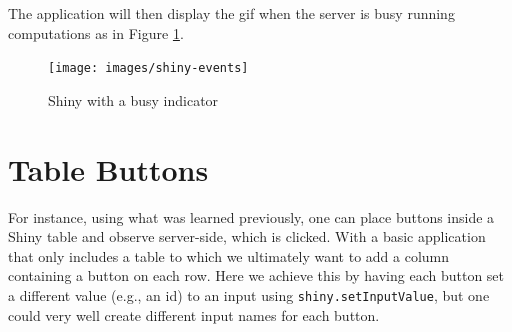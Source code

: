\documentclass[10pt,]{krantz}
\makeatletter
\newenvironment{Shaded}{\begin{snugshade}}{\end{snugshade}}
\newcommand{\ControlFlowTok}[1]{\textcolor[rgb]{0.27,0.27,0.27}{\textbf{#1}}}
\newcommand{\DataTypeTok}[1]{\textcolor[rgb]{0.27,0.27,0.27}{#1}}
\newcommand{\KeywordTok}[1]{\textcolor[rgb]{0.27,0.27,0.27}{\textbf{#1}}}
\newcommand{\NormalTok}[1]{#1}
\newcommand{\OperatorTok}[1]{\textcolor[rgb]{0.43,0.43,0.43}{\textbf{#1}}}
\newcommand{\OtherTok}[1]{\textcolor[rgb]{0.37,0.37,0.37}{#1}}
\newcommand{\StringTok}[1]{\textcolor[rgb]{0.5,0.5,0.5}{#1}}
\newenvironment{kframe}{%
\medskip{}
\setlength{\fboxsep}{.8em}
 \def\at@end@of@kframe{}%
 \ifinner\ifhmode%
  \def\at@end@of@kframe{\end{minipage}}%
  \begin{minipage}{\columnwidth}%
 \fi\fi%
 \def\FrameCommand##1{\hskip\@totalleftmargin \hskip-\fboxsep
 \colorbox{shadecolor}{##1}\hskip-\fboxsep
     \hskip-\linewidth \hskip-\@totalleftmargin \hskip\columnwidth}%
 \MakeFramed {\advance\hsize-\width
   \@totalleftmargin\z@ \linewidth\hsize
   \@setminipage}}%
 {\par\unskip\endMakeFramed%
 \at@end@of@kframe}
\renewenvironment{Shaded}{\begin{kframe}}{\end{kframe}}
\makeatother
\begin{document}
The application will then display the gif when the server is busy running computations as in Figure \ref{fig:shiny-events}.

\begin{figure}[H]

{\centering \texttt{[image: images/shiny-events]} 

}

\caption{Shiny with a busy indicator}\label{fig:shiny-events}
\end{figure}

\hypertarget{shiny-tips-table-btn}{%
\section{Table Buttons}\label{shiny-tips-table-btn}}

For instance, using what was learned previously, one can place buttons inside a Shiny table and observe server-side, which is clicked. With a basic application that only includes a table to which we ultimately want to add a column containing a button on each row. Here we achieve this by having each button set a different value (e.g., an id) to an input using \texttt{shiny.setInputValue}, but one could very well create different input names for each button.

\begin{Shaded}
\end{Shaded}
\end{document}

